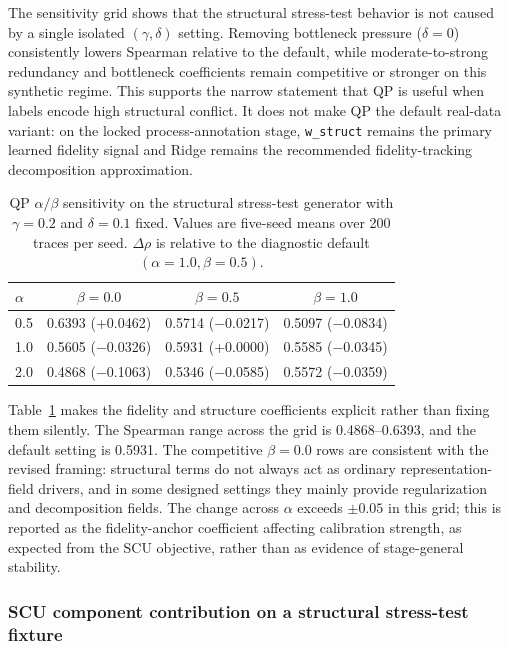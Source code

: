 \documentclass[pdflatex,sn-mathphys-num]{sn-jnl}
\begin{document}
The sensitivity grid shows that the structural stress-test behavior is not caused by a single isolated $(\gamma,\delta)$ setting. Removing bottleneck pressure ($\delta=0$) consistently lowers Spearman relative to the default, while moderate-to-strong redundancy and bottleneck coefficients remain competitive or stronger on this synthetic regime. This supports the narrow statement that QP is useful when labels encode high structural conflict. It does not make QP the default real-data variant: on the locked process-annotation stage, \texttt{w\_struct} remains the primary learned fidelity signal and Ridge remains the recommended fidelity-tracking decomposition approximation.

\begin{table}[ht]
\caption{QP $\alpha/\beta$ sensitivity on the structural stress-test generator with $\gamma=0.2$ and $\delta=0.1$ fixed. Values are five-seed means over 200 traces per seed. $\Delta\rho$ is relative to the diagnostic default $(\alpha=1.0,\beta=0.5)$.}
\label{tab:supp-alpha-beta-sensitivity}
\centering
\small
\begin{tabular}{lccc}
\toprule
\textbf{$\alpha$} & \textbf{$\beta=0.0$} & \textbf{$\beta=0.5$} & \textbf{$\beta=1.0$} \\
\midrule
0.5 & 0.6393 (+0.0462) & 0.5714 ($-$0.0217) & 0.5097 ($-$0.0834) \\
1.0 & 0.5605 ($-$0.0326) & 0.5931 (+0.0000) & 0.5585 ($-$0.0345) \\
2.0 & 0.4868 ($-$0.1063) & 0.5346 ($-$0.0585) & 0.5572 ($-$0.0359) \\
\bottomrule
\end{tabular}
\end{table}

Table~\ref{tab:supp-alpha-beta-sensitivity} makes the fidelity and structure coefficients explicit rather than fixing them silently. The Spearman range across the grid is 0.4868--0.6393, and the default setting is 0.5931. The competitive $\beta=0.0$ rows are consistent with the revised framing: structural terms do not always act as ordinary representation-field drivers, and in some designed settings they mainly provide regularization and decomposition fields. The change across $\alpha$ exceeds $\pm 0.05$ in this grid; this is reported as the fidelity-anchor coefficient affecting calibration strength, as expected from the SCU objective, rather than as evidence of stage-general stability.

\subsubsection{SCU component contribution on a structural stress-test fixture}
\end{document}
